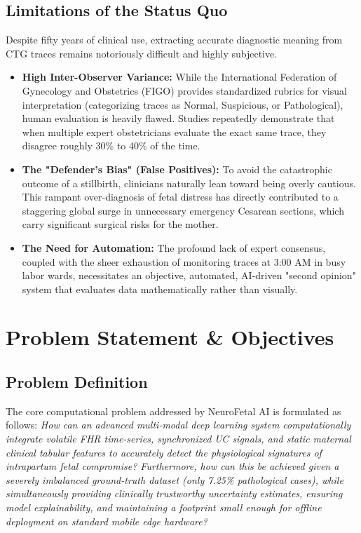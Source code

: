 \documentclass[12pt,a4paper]{report}
\begin{document}
\section{Limitations of the Status Quo}
Despite fifty years of clinical use, extracting accurate diagnostic meaning from CTG traces remains notoriously difficult and highly subjective. 
\begin{itemize}
    \item \textbf{High Inter-Observer Variance:} While the International Federation of Gynecology and Obstetrics (FIGO) provides standardized rubrics for visual interpretation (categorizing traces as Normal, Suspicious, or Pathological), human evaluation is heavily flawed. Studies repeatedly demonstrate that when multiple expert obstetricians evaluate the exact same trace, they disagree roughly 30\% to 40\% of the time.
    \item \textbf{The "Defender's Bias" (False Positives):} To avoid the catastrophic outcome of a stillbirth, clinicians naturally lean toward being overly cautious. This rampant over-diagnosis of fetal distress has directly contributed to a staggering global surge in unnecessary emergency Cesarean sections, which carry significant surgical risks for the mother. 
    \item \textbf{The Need for Automation:} The profound lack of expert consensus, coupled with the sheer exhaustion of monitoring traces at 3:00 AM in busy labor wards, necessitates an objective, automated, AI-driven "second opinion" system that evaluates data mathematically rather than visually.
\end{itemize}

\chapter{Problem Statement \& Objectives}
\section{Problem Definition}
The core computational problem addressed by NeuroFetal AI is formulated as follows: 
\textit{How can an advanced multi-modal deep learning system computationally integrate volatile FHR time-series, synchronized UC signals, and static maternal clinical tabular features to accurately detect the physiological signatures of intrapartum fetal compromise? Furthermore, how can this be achieved given a severely imbalanced ground-truth dataset (only 7.25\% pathological cases), while simultaneously providing clinically trustworthy uncertainty estimates, ensuring model explainability, and maintaining a footprint small enough for offline deployment on standard mobile edge hardware?}
\end{document}
